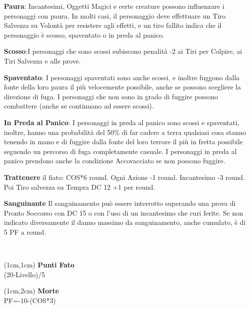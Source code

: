 \documentclass[a4paper,12 pt,openany]{book}
\begin{document}
\begin{textblock*}{19 cm}
\begin{multicols}{2}
\textbf{Paura}: Incantesimi, Oggetti Magici e certe creature possono influenzare i personaggi con paura. In molti casi, il personaggio deve effettuare un Tiro Salvezza su Volontà per resistere agli effetti, e un tiro fallito indica che il personaggio è scosso, spaventato o in preda al panico.
			
\textbf{Scosso}:I personaggi che sono scossi subiscono penalità -2 ai Tiri per Colpire, ai Tiri Salvezza e alle prove.
			
\textbf{Spaventato}: I personaggi spaventati sono anche scossi, e inoltre fuggono dalla fonte della loro paura il più velocemente possibile, anche se possono scegliere la direzione di fuga.
I personaggi che non sono in grado di fuggire possono combattere (anche se continuano ad essere scossi).
			
\textbf{In Preda al Panico}: I personaggi in preda al panico sono scossi e spaventati, inoltre, hanno una probabilità del 50\% di far cadere a terra qualsiasi cosa stanno tenendo in mano e di fuggire dalla fonte del loro terrore il più in fretta possibile seguendo un percorso di fuga completamente casuale.
I personaggi in preda al panico prendono anche la condizione Accovacciato se non possono fuggire.
			
\textbf{Trattenere} il fiato: COS*6 round. Ogni Azione -1 round. Incantesimo -3 round. Poi Tiro salvezza su Tempra DC 12 +1 per round.
			
\textbf{Sanguinante} Il sanguinamento può essere interrotto superando una prova di Pronto Soccorso con DC 15 o con l'uso di un incantesimo che curi ferite.
Se non indicato diversamente il danno massimo da sanguinamento, anche cumulato, è di 5 PF a round.
\end{multicols}
		
	\end{textblock*}
	
	~\newpage
	
	\begin{textblock*}{4cm}(1cm,1cm) %
		{\textbf{Punti Fato}\\
			\footnotesize 
			(20-Livello)/5}
	\end{textblock*}	
	
	\begin{textblock*}{4cm}(1cm,2cm) %
		{\textbf{Morte}\\
			\footnotesize 
			PF=-10-(COS*3)}
	\end{textblock*}	
\end{document}
